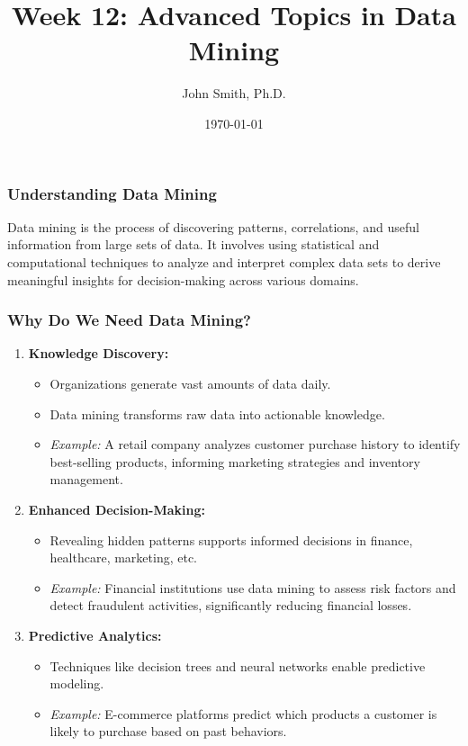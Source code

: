 \documentclass[aspectratio=169]{beamer}
\title[Advanced Topics in Data Mining]{Week 12: Advanced Topics in Data Mining}
\author[J. Smith]{John Smith, Ph.D.}
\institute[University Name]{
  Department of Computer Science\\
  University Name\\
  \vspace{0.3cm}
  Email: email@university.edu\\
  Website: www.university.edu
}
\date{\today}
\begin{document}
\frame{\titlepage}

\begin{frame}[fragile]
  \titlepage
\end{frame}

\begin{frame}[fragile]
    \frametitle{Understanding Data Mining}

    Data mining is the process of discovering patterns, correlations, and useful information from large sets of data. It involves using statistical and computational techniques to analyze and interpret complex data sets to derive meaningful insights for decision-making across various domains.
\end{frame}

\begin{frame}[fragile]
    \frametitle{Why Do We Need Data Mining?}

    \begin{enumerate}
        \item \textbf{Knowledge Discovery:}
        \begin{itemize}
            \item Organizations generate vast amounts of data daily.
            \item Data mining transforms raw data into actionable knowledge.
            \item \textit{Example:} A retail company analyzes customer purchase history to identify best-selling products, informing marketing strategies and inventory management.
        \end{itemize}

        \item \textbf{Enhanced Decision-Making:}
        \begin{itemize}
            \item Revealing hidden patterns supports informed decisions in finance, healthcare, marketing, etc.
            \item \textit{Example:} Financial institutions use data mining to assess risk factors and detect fraudulent activities, significantly reducing financial losses.
        \end{itemize}

        \item \textbf{Predictive Analytics:}
        \begin{itemize}
            \item Techniques like decision trees and neural networks enable predictive modeling.
            \item \textit{Example:} E-commerce platforms predict which products a customer is likely to purchase based on past behaviors.
        \end{itemize}
    \end{enumerate}
\end{frame}
\end{document}
